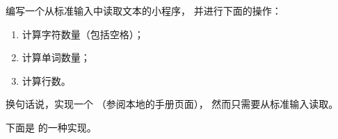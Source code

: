 \begin{Exercise}[title={单词和字母统计},difficulty=5]
\label{ex:wc}
\Question\label{ex:wc q1}编写一个从标准输入中读取文本的小程序，
并进行下面的操作：
\begin{enumerate}
\item{计算字符数量（包括空格）；}
\item{计算单词数量；}
\item{计算行数。}
\end{enumerate}
换句话说，实现一个 （参阅本地的手册页面），
然而只需要从标准输入读取。
\end{Exercise}

\begin{Answer}
\Question 下面是  的一种实现。

\showremarks
\end{Answer}
